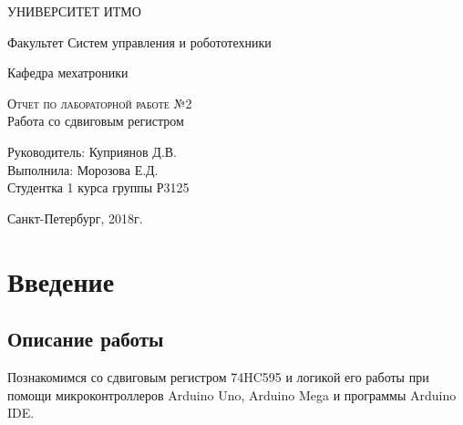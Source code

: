 \documentclass[12pt,a4paper]{scrartcl}
\begin{document}
\begin{titlepage}
  \begin{center}
    \large
 
    УНИВЕРСИТЕТ ИТМО
    \vspace{0.25cm}
     
    Факультет Систем управления и робототехники
     
    Кафедра мехатроники
    \vfill
 
    \textsc{Отчет по лабораторной работе №2}\\[5mm]
     
    {\LARGE Работа со сдвиговым регистром}

\end{center}
\vfill
 
\newlength{\ML}
\hfill\begin{minipage}{0.4\textwidth}
  Руководитель: Куприянов Д.В.\\
  Выполнила: Морозова Е.Д. \\
  Студентка 1 курса группы Р3125\\
  
  
\end{minipage}%
\bigskip

 
\begin{center}
  Санкт-Петербург, 2018г.
\end{center}
\end{titlepage}

\begin{tableofcontents}
\end{tableofcontents}
    \newpage
    
\section{Введение}

\label{sec:intro}
 

\subsection{Описание работы}
Познакомимся со сдвиговым регистром 74HC595 и логикой его работы при помощи микроконтроллеров Arduino Uno, Arduino Mega и программы Arduino IDE.\\
\\
\end{document}
